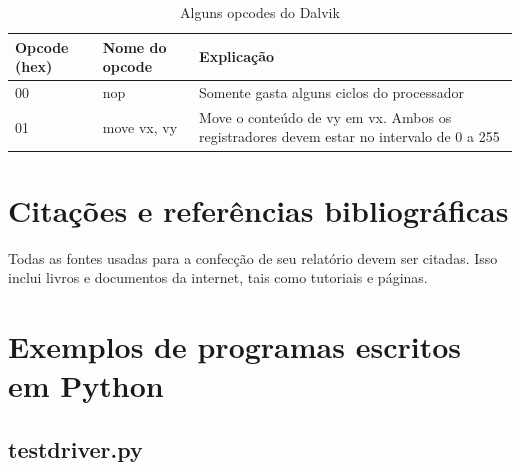 \documentclass[12pt,a4paper,twoside]{report}
\begin{document}
\begin{table}[h]
  \centering
  \caption{Alguns opcodes do Dalvik \label{tab:opcode2}}
  \begin{tabular}{p{1.5cm}lp{9cm}} \hline
  {\bf Opcode (hex)} & {\bf Nome do opcode} & {\bf Explicação} \\ \hline
  00 & nop & Somente gasta alguns ciclos do processador \\ \hline
  01 & move vx, vy & Move o conteúdo de vy em vx. Ambos os registradores
   devem estar no intervalo de 0 a 255 \\\hline
  \end{tabular}
\end{table}

\chapter{Citações e referências bibliográficas}
Todas as fontes usadas para a confecção de seu relatório devem ser citadas. Isso
inclui livros e documentos da internet, tais como tutoriais e páginas.

\clearpage
{}
\appendix

\chapter{Exemplos de programas escritos em Python \label{ap:Testes}}
\section{testdriver.py}

\end{document}
